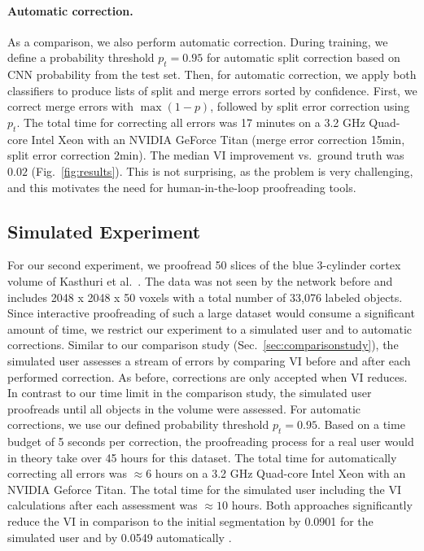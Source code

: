 \paragraph{Automatic correction.} As a comparison, we also perform automatic correction. During training, we define a probability threshold $p_t=0.95$ for automatic split correction based on CNN probability from the test set. Then, for automatic correction, we apply both classifiers to produce lists of split and merge errors sorted by confidence. First, we correct merge errors with $\max(1-p)$, followed by split error correction using $p_t$. The total time for correcting all errors was 17 minutes on a 3.2 GHz Quad-core Intel Xeon with an NVIDIA GeForce Titan (merge error correction 15min, split error correction 2min). The median VI improvement vs.~ground truth was $0.02$ (Fig.~\ref{fig:results}). This is not surprising, as the problem is very challenging, and this motivates the need for human-in-the-loop proofreading tools.

\subsection{Simulated Experiment}

For our second experiment, we proofread 50 slices of the blue 3-cylinder cortex volume of Kasthuri et al.~\cite{kasthuri2015saturated}. The data was not seen by the network before and includes 2048 x 2048 x 50 voxels with a total number of 33,076 labeled objects. Since interactive proofreading of such a large dataset would consume a significant amount of time, we restrict our experiment to a simulated user and to automatic corrections. Similar to our comparison study (Sec.~\ref{sec:comparisonstudy}), the simulated user assesses a stream of errors by comparing VI before and after each performed correction. As before, corrections are only accepted when VI reduces. In contrast to our time limit in the comparison study, the simulated user proofreads until all objects in the volume were assessed. For automatic corrections, we use our defined probability threshold $p_t=0.95$. 
Based on a time budget of 5 seconds per correction, the proofreading process for a real user would in theory take over 45 hours for this dataset. The total time for automatically correcting all errors was $\approx6$ hours on a 3.2 GHz Quad-core Intel Xeon with an NVIDIA Geforce Titan. The total time for the simulated user including the VI calculations after each assessment was $\approx10$ hours. Both approaches significantly reduce the VI in comparison to the initial segmentation by 0.0901 for the simulated user and by 0.0549 automatically . 